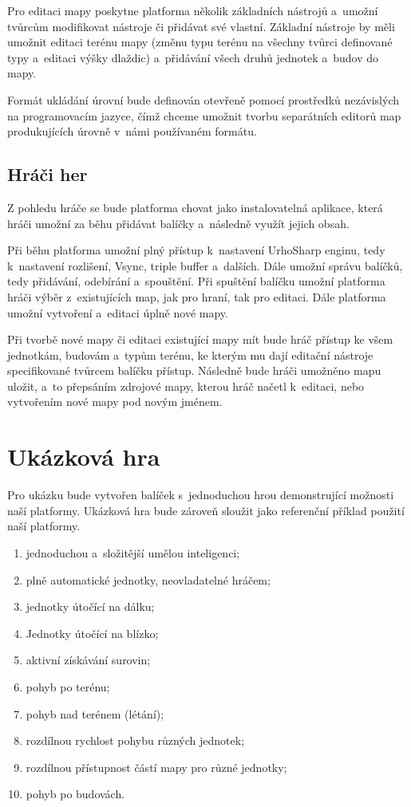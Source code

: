 Pro editaci mapy poskytne platforma několik základních nástrojů a~umožní tvůrcům modifikovat nástroje či přidávat své vlastní. Základní nástroje by měli umožnit editaci terénu mapy (změnu typu terénu na všechny tvůrci definované typy a~editaci výšky dlaždic) a~přidávání všech druhů jednotek a~budov do mapy.

Formát ukládání úrovní bude definován otevřeně pomocí prostředků nezávislých na programovacím jazyce, čímž chceme umožnit tvorbu separátních editorů map produkujících úrovně v~námi používaném formátu.

\subsection{Hráči her}
Z pohledu hráče se bude platforma chovat jako instalovatelná aplikace, která hráči umožní za běhu přidávat balíčky a~následně využít jejich obsah.

Při běhu platforma umožní plný přístup k~nastavení UrhoSharp enginu, tedy k~nastavení rozlišení, Vsync, triple buffer a~dalších. Dále umožní správu balíčků, tedy přidávání, odebírání a~spouštění. Při spuštění balíčku umožní platforma hráči výběr z~existujících map, jak pro hraní, tak pro editaci. Dále platforma umožní vytvoření a~editaci úplně nové mapy.

Při tvorbě nové mapy či editaci existující mapy mít bude hráč přístup ke všem jednotkám, budovám a~typům terénu, ke kterým mu dají editační nástroje specifikované tvůrcem balíčku přístup. Následně bude hráči umožněno mapu uložit, a~to přepsáním zdrojové mapy, kterou hráč načetl k~editaci, nebo vytvořením nové mapy pod novým jménem.

\section{Ukázková hra}
\label{sec:showcasedef}

Pro ukázku bude vytvořen balíček s~jednoduchou hrou demonstrující možnosti naší platformy. Ukázková hra bude zároveň sloužit jako referenční příklad použití naší platformy.

\begin{enumerate}
	\item jednoduchou a~složitější umělou inteligenci;
	\item plně automatické jednotky, neovladatelné hráčem;
	\item jednotky útočící na dálku;
	\item Jednotky útočící na blízko;
	\item aktivní získávání surovin;
	\item pohyb po terénu;
	\item pohyb nad terénem (létání);
	\item rozdílnou rychlost pohybu různých jednotek;
	\item rozdílnou přístupnost částí mapy pro různé jednotky;
	\item pohyb po budovách.
\end{enumerate}

